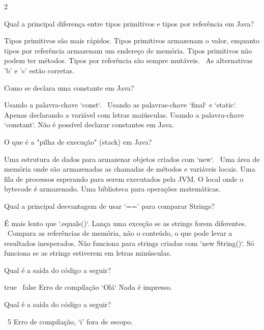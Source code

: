 \documentclass{exam}
\newcounter{solcount}
\newcommand\CC{\
    \CorrectChoice\label{sol:\arabic{solcount}}}
\begin{document}
\begin{questions}
\begin{multicols}{2}

\question[1] Qual a principal diferença entre tipos primitivos e tipos por referência em Java?
\begin{choices}
 \choice Tipos primitivos são mais rápidos.
 \choice Tipos primitivos armazenam o valor, enquanto tipos por referência armazenam um endereço de memória.
 \choice Tipos primitivos não podem ter métodos.
 \choice Tipos por referência são sempre mutáveis.
 \CC As alternativas 'b' e 'c' estão corretas.
\end{choices}

\question[1] Como se declara uma constante em Java?
\begin{choices}
 \choice Usando a palavra-chave `const`.
 \CC Usando as palavras-chave `final` e `static`.
 \choice Apenas declarando a variável com letras maiúsculas.
 \choice Usando a palavra-chave `constant`.
 \choice Não é possível declarar constantes em Java.
\end{choices}

\question[1] O que é a "pilha de execução" (stack) em Java?
\begin{choices}
 \choice Uma estrutura de dados para armazenar objetos criados com `new`.
 \CC Uma área de memória onde são armazenadas as chamadas de métodos e variáveis locais.
 \choice Uma fila de processos esperando para serem executados pela JVM.
 \choice O local onde o bytecode é armazenado.
 \choice Uma biblioteca para operações matemáticas.
\end{choices}

\question[1] Qual a principal desvantagem de usar `==' para comparar Strings?
\begin{choices}
 \choice É mais lento que `.equals()`.
 \choice Lança uma exceção se as strings forem diferentes.
 \CC Compara as referências de memória, não o conteúdo, o que pode levar a resultados inesperados.
 \choice Não funciona para strings criadas com `new String()`.
 \choice Só funciona se as strings estiverem em letras minúsculas.
\end{choices}

\question[1] Qual é a saída do código a seguir?

\begin{choices}
 \choice true
 \CC false
 \choice Erro de compilação
 \choice `Olá`
 \choice Nada é impresso.
\end{choices}

\question[1] Qual é a saída do código a seguir?

\begin{choices}
 \CC 5
 \choice Erro de compilação, `i' fora de escopo.
\end{choices}


\end{multicols}
\end{questions}
\end{document}
